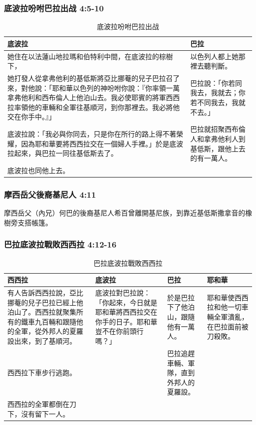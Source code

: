 \subsubsection{底波拉吩咐巴拉出战 4:5-10}
\begin{table}[H]
\centering
\begin{tabular}{p{11.7cm}|p{5.3cm}}\hline\hline
底波拉&巴拉\\\hline
她住在以法蓮山地拉瑪和伯特利中間，在底波拉的棕樹下，
&以色列人都上她那裡去聽判斷。\\\hline
她打發人從拿弗他利的基低斯將亞比挪菴的兒子巴拉召了來，對他說：「耶和華以色列的神吩咐你說：『你率領一萬拿弗他利和西布倫人上他泊山去。我必使耶賓的將軍西西拉率領他的車輛和全軍往基順河，到你那裡去。我必將他交在你手中。』」&巴拉說：「你若同我去，我就去；你若不同我去，我就不去。」\\\hline
底波拉說：「我必與你同去，只是你在所行的路上得不著榮耀，因為耶和華要將西西拉交在一個婦人手裡。」於是底波拉起來，與巴拉一同往基低斯去了。&巴拉就招聚西布倫人和拿弗他利人到基低斯，跟他上去的有一萬人。\\\hline
底波拉也同他上去。&\\\hline
 \end{tabular}
\caption{底波拉吩咐巴拉出战}
\end{table}



\subsubsection{摩西岳父後裔基尼人 4:11}
摩西岳父（內兄）何巴的後裔基尼人希百曾離開基尼族，到靠近基低斯撒拿音的橡樹旁支搭帳篷。

\subsubsection{巴拉底波拉戰敗西西拉 4:12-16}
\begin{table}[H]
\centering
\begin{tabular}{p{6.5cm}|p{3.98cm}|p{3.5cm}|p{2.5cm}}\hline\hline
西西拉&底波拉&巴拉&耶和華\\\hline
有人告訴西西拉說，亞比挪菴的兒子巴拉已經上他泊山了。西西拉就聚集所有的鐵車九百輛和跟隨他的全軍，從外邦人的夏羅設出來，到了基順河。
&底波拉對巴拉說：「你起來，今日就是耶和華將西西拉交在你手的日子。耶和華豈不在你前頭行嗎？」&於是巴拉下了他泊山，跟隨他有一萬人。&耶和華使西西拉和他一切車輛全軍潰亂，在巴拉面前被刀殺敗。\\\hline
西西拉下車步行逃跑。&&巴拉追趕車輛、軍隊，直到外邦人的夏羅設。&\\\hline
西西拉的全軍都倒在刀下，沒有留下一人。&&&\\\hline
 \end{tabular}
\caption{巴拉底波拉戰敗西西拉}
\end{table}



